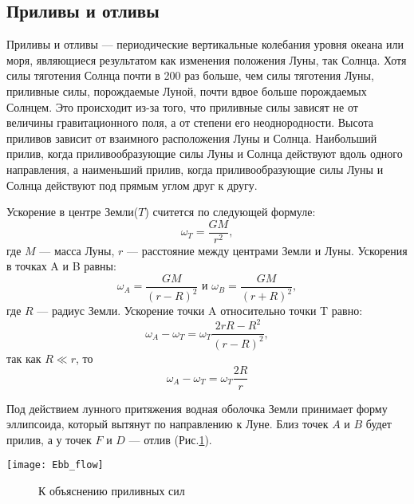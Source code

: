 \subsection{Приливы и отливы}

Приливы и отливы --- периодические вертикальные колебания уровня океана или 
моря, являющиеся результатом как изменения положения Луны, так Солнца. Хотя 
силы тяготения Солнца почти в 200 раз больше, чем силы тяготения Луны, 
приливные силы, порождаемые Луной, почти вдвое больше порождаемых Солнцем. Это 
происходит из-за того, что приливные силы зависят не от величины 
гравитационного поля, а от степени его неоднородности. Высота приливов зависит 
от взаимного расположения Луны и Солнца. Наибольший прилив, когда 
приливообразующие силы Луны и Солнца действуют вдоль одного направления, а 
наименьший прилив, когда приливообразующие силы Луны и Солнца действуют под 
прямым углом друг к другу.

Ускорение в центре Земли($T$) считется по следующей формуле: 
\begin{equation}\omega_T=\frac{GM}{r^2},
\end{equation}
где $M$ --- масса Луны, $r$ --- расстояние между центрами Земли и Луны. 
Ускорения в точках A и B равны:
\begin{equation}\omega_A=\frac{GM}{(r-R)^2} \text{ и } 
\omega_B=\frac{GM}{(r+R)^2},
\end{equation}
где $R$ --- радиус Земли. Ускорение точки A относительно точки T равно:
\begin{equation}\omega_A-\omega_T=\omega_T\frac{2rR-R^2}{(r-R)^2},
\end{equation}
так как $R\ll r$, то \begin{equation}\omega_A-\omega_T=\omega_T\frac{2R}{r}
\end{equation}

Под действием лунного притяжения водная оболочка Земли принимает форму 
эллипсоида, который вытянут по направлению к Луне. Близ точек $A$ и $B$ будет 
прилив, а у точек $F$ и $D$ --- отлив (Рис.\ref{Ebb_flow}).
\begin{center}
\texttt{[image: Ebb\_flow]}
\begin{figure}[h!]
\caption{К объяснению приливных сил}\label{Ebb_flow}
\end{figure}
\end{center}
